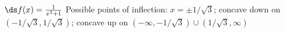 {$\ds f(x) = \frac{1}{x^2+1}$
}
{Possible points of inflection: $x=\pm1/\sqrt{3}$;
concave down on $(-1/\sqrt{3},1/\sqrt{3})$;
concave up on $(-\infty,-1/\sqrt{3}) \cup (1/\sqrt{3},\infty)$
}
